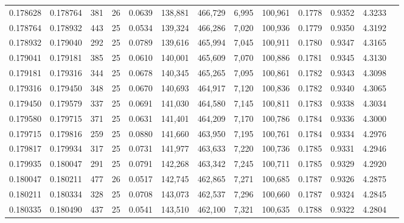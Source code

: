 \begin{tabular}{rrrrrrrrrrrrr}
0.178628 & 0.178764 &   381 &  26 &                                     0.0639 & 138,881 & 466,729 &   6,995 & 100,961 & 0.1778 & 0.9352 & 4.3233 \\
0.178764 & 0.178932 &   443 &  25 &                                     0.0534 & 139,324 & 466,286 &   7,020 & 100,936 & 0.1779 & 0.9350 & 4.3192 \\
0.178932 & 0.179040 &   292 &  25 &                                     0.0789 & 139,616 & 465,994 &   7,045 & 100,911 & 0.1780 & 0.9347 & 4.3165 \\
0.179041 & 0.179181 &   385 &  25 &                                     0.0610 & 140,001 & 465,609 &   7,070 & 100,886 & 0.1781 & 0.9345 & 4.3130 \\
0.179181 & 0.179316 &   344 &  25 &                                     0.0678 & 140,345 & 465,265 &   7,095 & 100,861 & 0.1782 & 0.9343 & 4.3098 \\
0.179316 & 0.179450 &   348 &  25 &                                     0.0670 & 140,693 & 464,917 &   7,120 & 100,836 & 0.1782 & 0.9340 & 4.3065 \\
0.179450 & 0.179579 &   337 &  25 &                                     0.0691 & 141,030 & 464,580 &   7,145 & 100,811 & 0.1783 & 0.9338 & 4.3034 \\
0.179580 & 0.179715 &   371 &  25 &                                     0.0631 & 141,401 & 464,209 &   7,170 & 100,786 & 0.1784 & 0.9336 & 4.3000 \\
0.179715 & 0.179816 &   259 &  25 &                                     0.0880 & 141,660 & 463,950 &   7,195 & 100,761 & 0.1784 & 0.9334 & 4.2976 \\
0.179817 & 0.179934 &   317 &  25 &                                     0.0731 & 141,977 & 463,633 &   7,220 & 100,736 & 0.1785 & 0.9331 & 4.2946 \\
0.179935 & 0.180047 &   291 &  25 &                                     0.0791 & 142,268 & 463,342 &   7,245 & 100,711 & 0.1785 & 0.9329 & 4.2920 \\
0.180047 & 0.180211 &   477 &  26 &                                     0.0517 & 142,745 & 462,865 &   7,271 & 100,685 & 0.1787 & 0.9326 & 4.2875 \\
0.180211 & 0.180334 &   328 &  25 &                                     0.0708 & 143,073 & 462,537 &   7,296 & 100,660 & 0.1787 & 0.9324 & 4.2845 \\
0.180335 & 0.180490 &   437 &  25 &                                     0.0541 & 143,510 & 462,100 &   7,321 & 100,635 & 0.1788 & 0.9322 & 4.2804 \\

\end{tabular}
